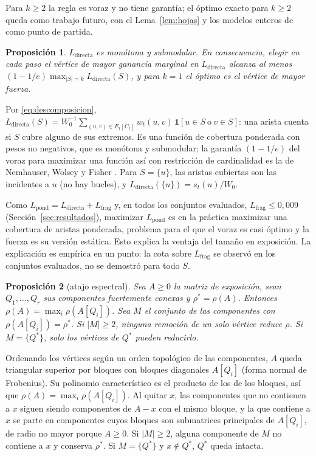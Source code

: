 \documentclass[journal]{IEEEtran}
\newtheorem{proposicion}{Proposición}
\begin{document}
Para $k\geq2$ la regla es voraz y no tiene garantía; el óptimo exacto para
$k\geq2$ queda como trabajo futuro, con el Lema~\ref{lem:hojas} y los modelos
enteros de \cite{shen2012interdiction} como punto de partida.

\begin{proposicion}\label{prop:submod}
$L_{\mathrm{directa}}$ es monótona y submodular. En consecuencia, elegir en cada
paso el vértice de mayor ganancia marginal en $L_{\mathrm{directa}}$ alcanza al
menos $(1-1/e)\max_{|S|=k}L_{\mathrm{directa}}(S)$, y para $k=1$ el óptimo es el
vértice de mayor fuerza.
\end{proposicion}

\begin{IEEEproof}[Prueba]
Por \eqref{eq:descomposicion},
$L_{\mathrm{directa}}(S)=W_0^{-1}\sum_{(u,v)\in E_t[C_t]}w_t(u,v)\,
\mathbf 1[u\in S\ \text{o}\ v\in S]$: una arista cuenta si $S$ cubre alguno de
sus extremos. Es una función de cobertura ponderada con pesos no negativos, que
es monótona y submodular; la garantía $(1-1/e)$ del voraz para maximizar una
función así con restricción de cardinalidad es la de Nemhauser, Wolsey y Fisher
\cite{nemhauser1978analysis}. Para $S=\{u\}$, las aristas cubiertas son las
incidentes a $u$ (no hay bucles), y $L_{\mathrm{directa}}(\{u\})=s_t(u)/W_0$.
\end{IEEEproof}

Como $L_{\mathrm{pond}}=L_{\mathrm{directa}}+L_{\mathrm{frag}}$ y, en todos los
conjuntos evaluados, $L_{\mathrm{frag}}\leq0{,}009$ (Sección~\ref{sec:resultados}),
maximizar $L_{\mathrm{pond}}$ es en la práctica maximizar una cobertura de aristas
ponderada, problema para el que el voraz es casi óptimo y la fuerza es su
versión estática. Esto explica la ventaja del tamaño en exposición. La
explicación es empírica en un punto: la cota sobre $L_{\mathrm{frag}}$ se observó
en los conjuntos evaluados, no se demostró para todo $S$.

\begin{proposicion}[atajo espectral]\label{prop:espectral}
Sea $A\geq0$ la matriz de exposición, sean $Q_1,\dots,Q_r$ sus componentes
fuertemente conexas y $\rho^\ast=\rho(A)$. Entonces
$\rho(A)=\max_i\rho(A[Q_i])$. Sea $M$ el conjunto de las componentes con
$\rho(A[Q_i])=\rho^\ast$. Si $|M|\geq2$, ninguna remoción de un solo vértice
reduce $\rho$. Si $M=\{Q^\ast\}$, solo los vértices de $Q^\ast$ pueden reducirlo.
\end{proposicion}

\begin{IEEEproof}[Prueba]
Ordenando los vértices según un orden topológico de las componentes, $A$ queda
triangular superior por bloques con bloques diagonales $A[Q_i]$ (forma normal de
Frobenius). Su polinomio característico es el producto de los de los bloques,
así que $\rho(A)=\max_i\rho(A[Q_i])$. Al quitar $x$, las componentes que no
contienen a $x$ siguen siendo componentes de $A-x$ con el mismo bloque, y la
que contiene a $x$ se parte en componentes cuyos bloques son submatrices
principales de $A[Q_i]$, de radio no mayor porque $A\geq0$. Si $|M|\geq2$,
alguna componente de $M$ no contiene a $x$ y conserva $\rho^\ast$. Si
$M=\{Q^\ast\}$ y $x\notin Q^\ast$, $Q^\ast$ queda intacta.
\end{IEEEproof}
\end{document}
